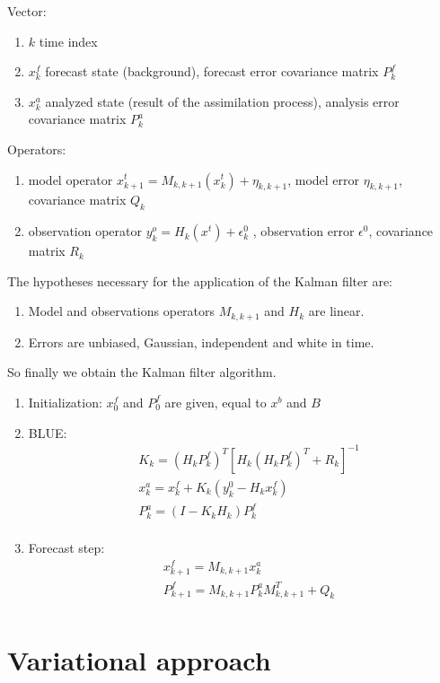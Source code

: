 \documentclass{article}
\begin{document}
\noindent Vector:
 \begin{enumerate}[label=\textbullet]
		\item $k$ time index
		\item $x_{k}^{f}$ forecast state (background), forecast error covariance matrix $P_{k}^{f}$
		\item $x_{k}^{a}$ analyzed state (result of the assimilation process), analysis error covariance matrix $P_{k}^{a}$
	\end{enumerate}
\noindent Operators:
    \begin{enumerate}[label=\textbullet]
		\item model operator $x_{k+1}^{t} = M_{k,k+1}(x_{k}^{t})+ \eta
		_{k,k+1}$, model error $\eta
		_{k,k+1}$, covariance matrix $Q_k$
		\item observation operator $y_k^o = H_k (x^t ) + \epsilon_k^0$ , observation error $\epsilon^0$, covariance matrix $R_k$
	\end{enumerate}
\noindent The hypotheses necessary for the application of the Kalman filter are:
    \begin{enumerate}[label=\textbullet]
		\item Model and observations operators $M_{k,k+1}$ and $H_k$ are linear.
		\item Errors are unbiased, Gaussian, independent and white in time.
	\end{enumerate}
So finally we obtain the Kalman filter algorithm.
\begin{enumerate}[label=(\roman*)]
\item Initialization: $x_0^f$ and $P_0^f$ are given, equal to $x^b$ and $B$
\item BLUE:
$$\begin{aligned} &K_k=(H_kP_k^f)^T[H_k(H_kP_k^f)^T+R_k]^{-1} \\
&x_k^a=x_k^f+K_k(y_k^0-H_kx_k^f) \\
&P_k^a=(I-K_kH_k)P_k^f \\
\end{aligned}$$
\item Forecast step:
$$\begin{aligned} 
&x_{k+1}^f=M_{k,k+1}x_k^a \\
&P_{k+1}^f=M_{k,k+1}P_k^aM_{k,k+1}^T+Q_k\\
\end{aligned}$$
\end{enumerate}



\section{Variational approach}
\end{document}
